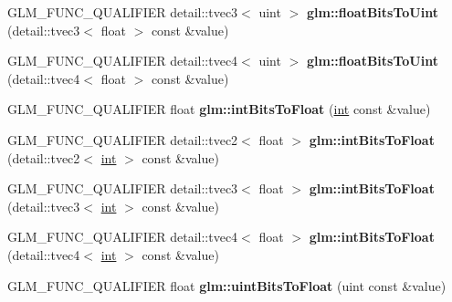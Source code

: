 \begin{DoxyCompactItemize}
\item 
\hypertarget{namespaceglm_a9e237f6129858d6a60a5fbb311940b7a}{}G\+L\+M\+\_\+\+F\+U\+N\+C\+\_\+\+Q\+U\+A\+L\+I\+F\+I\+E\+R detail\+::tvec3$<$ uint $>$ {\bfseries glm\+::float\+Bits\+To\+Uint} (detail\+::tvec3$<$ float $>$ const \&value)\label{namespaceglm_a9e237f6129858d6a60a5fbb311940b7a}

\item 
\hypertarget{namespaceglm_a597a1ed8073a6f211a0b99bc5bcb5e81}{}G\+L\+M\+\_\+\+F\+U\+N\+C\+\_\+\+Q\+U\+A\+L\+I\+F\+I\+E\+R detail\+::tvec4$<$ uint $>$ {\bfseries glm\+::float\+Bits\+To\+Uint} (detail\+::tvec4$<$ float $>$ const \&value)\label{namespaceglm_a597a1ed8073a6f211a0b99bc5bcb5e81}

\item 
\hypertarget{namespaceglm_aa13860620ac74cd63473808c6566b004}{}G\+L\+M\+\_\+\+F\+U\+N\+C\+\_\+\+Q\+U\+A\+L\+I\+F\+I\+E\+R float {\bfseries glm\+::int\+Bits\+To\+Float} (\hyperlink{_s_d_l__thread_8h_a6a64f9be4433e4de6e2f2f548cf3c08e}{int} const \&value)\label{namespaceglm_aa13860620ac74cd63473808c6566b004}

\item 
\hypertarget{namespaceglm_aeff766c2b3cd8e57cc766db3d6c05584}{}G\+L\+M\+\_\+\+F\+U\+N\+C\+\_\+\+Q\+U\+A\+L\+I\+F\+I\+E\+R detail\+::tvec2$<$ float $>$ {\bfseries glm\+::int\+Bits\+To\+Float} (detail\+::tvec2$<$ \hyperlink{_s_d_l__thread_8h_a6a64f9be4433e4de6e2f2f548cf3c08e}{int} $>$ const \&value)\label{namespaceglm_aeff766c2b3cd8e57cc766db3d6c05584}

\item 
\hypertarget{namespaceglm_aee5c11244c968fb1c469ef36b8bee088}{}G\+L\+M\+\_\+\+F\+U\+N\+C\+\_\+\+Q\+U\+A\+L\+I\+F\+I\+E\+R detail\+::tvec3$<$ float $>$ {\bfseries glm\+::int\+Bits\+To\+Float} (detail\+::tvec3$<$ \hyperlink{_s_d_l__thread_8h_a6a64f9be4433e4de6e2f2f548cf3c08e}{int} $>$ const \&value)\label{namespaceglm_aee5c11244c968fb1c469ef36b8bee088}

\item 
\hypertarget{namespaceglm_a294e8d88fb5291ef59df36fb925d70bc}{}G\+L\+M\+\_\+\+F\+U\+N\+C\+\_\+\+Q\+U\+A\+L\+I\+F\+I\+E\+R detail\+::tvec4$<$ float $>$ {\bfseries glm\+::int\+Bits\+To\+Float} (detail\+::tvec4$<$ \hyperlink{_s_d_l__thread_8h_a6a64f9be4433e4de6e2f2f548cf3c08e}{int} $>$ const \&value)\label{namespaceglm_a294e8d88fb5291ef59df36fb925d70bc}

\item 
\hypertarget{namespaceglm_aa621d0e67181e4ccd5588259bcc393ab}{}G\+L\+M\+\_\+\+F\+U\+N\+C\+\_\+\+Q\+U\+A\+L\+I\+F\+I\+E\+R float {\bfseries glm\+::uint\+Bits\+To\+Float} (uint const \&value)\label{namespaceglm_aa621d0e67181e4ccd5588259bcc393ab}


\end{DoxyCompactItemize}
